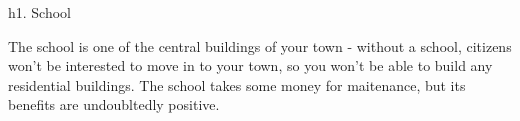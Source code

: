 h1. School

The school is one of the central buildings of your town - without a school, citizens won't be interested to move in to your town, so you won't be able to build any residential buildings. The school takes some money for maitenance, but its benefits are undoubltedly positive.